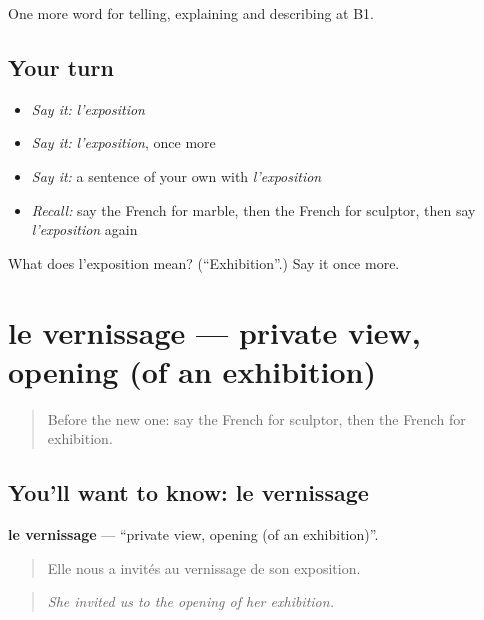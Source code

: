 \begin{grammarlens}[title={What you've built}]
One more word for telling, explaining and describing at B1.
\end{grammarlens}

\subsection*{Your turn}
\begin{itemize}
\raggedright
  \item \emph{Say it:} \emph{l'exposition}
  \item \emph{Say it:} \emph{l'exposition}, once more
  \item \emph{Say it:} a sentence of your own with \emph{l'exposition}
  \item \emph{Recall:} say the French for marble, then the French for sculptor, then say \emph{l'exposition} again
\end{itemize}

\begin{tcolorbox}[breakable,colback=teal!4,colframe=teal!35!black,title={Before you move on}]
What does l'exposition mean? (\textquotedblleft{}Exhibition\textquotedblright{}.) Say it once more.
\end{tcolorbox}
\section[le vernissage]{le vernissage — private view, opening (of an exhibition)}

\label{lesson:FR-C518-vernissage}



\begin{quote}
Before the new one: say the French for sculptor, then the French for exhibition.
\end{quote}

\subsection*{You'll want to know: le vernissage}
\textbf{le vernissage} — \textquotedblleft{}private view, opening (of an exhibition)\textquotedblright{}.

\begin{quote}
Elle nous a invités au vernissage de son exposition.
\end{quote}

\begin{quote}
\emph{She invited us to the opening of her exhibition.}
\end{quote}

